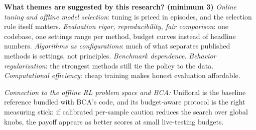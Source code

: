 \documentclass[11pt]{article}
\newcommand{\q}[2]{\item \textbf{#1} #2}
\newcommand{\tiein}[1]{\par\smallskip\noindent\emph{Connection to the offline RL problem space and BCA:} #1\par\medskip}
\begin{document}
\begin{qna}
\q{What themes are suggested by this research? (minimum 3)}
\emph{Online tuning and offline model selection}: tuning is priced in episodes, and the selection rule itself matters. \emph{Evaluation rigor, reproducibility, fair comparison}: one codebase, one settings range per method, budget curves instead of headline numbers. \emph{Algorithms as configurations}: much of what separates published methods is settings, not principles. \emph{Benchmark dependence}. \emph{Behavior regularization}: the strongest methods still tie the policy to the data. \emph{Computational efficiency}: cheap training makes honest evaluation affordable.

\end{qna}
\tiein{Unifloral is the baseline reference bundled with BCA's code, and its budget-aware protocol is the right measuring stick: if calibrated per-sample caution reduces the search over global knobs, the payoff appears as better scores at small live-testing budgets.}
\end{document}
